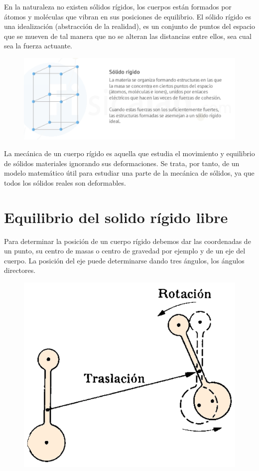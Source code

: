 En la naturaleza no existen sólidos rígidos, los cuerpos están formados por átomos y moléculas que vibran en sus posiciones de equilibrio. El sólido rígido es una idealización (abstracción de la realidad), es un conjunto de puntos del espacio que se mueven de tal manera que no se alteran las distancias entre ellos, sea cual sea la fuerza actuante.

\begin{figure}[H]
	\centering
	\includegraphics[width=1\textwidth]{imagenes/imagenes06/T06IM03.png}
\end{figure}

La mecánica de un cuerpo rígido es aquella que estudia el movimiento y equilibrio de sólidos materiales ignorando sus deformaciones. Se trata, por tanto, de un modelo matemático útil para estudiar una parte de la mecánica de sólidos, ya que todos los sólidos reales son deformables. 

\section{Equilibrio del solido rígido libre}

\begin{multicols}{2}
Para determinar la posición de un cuerpo rígido debemos dar las coordenadas de un punto, su centro de masas o centro de gravedad por ejemplo y de un eje del cuerpo. La posición del eje puede determinarse dando tres ángulos, los ángulos directores.

\begin{figure}[H]
	\centering
	\includegraphics[width=.4\textwidth]{imagenes/imagenes06/T06IM04.png}
\end{figure}
\end{multicols}

